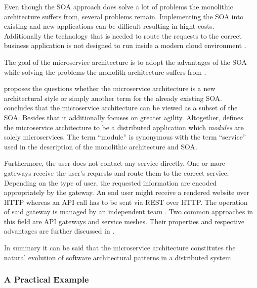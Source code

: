 Even though the \ac{SOA} approach does solve a lot of problems the monolithic
architecture suffers from, several problems remain. Implementing the \ac{SOA}
into existing and new applications can be difficult resulting in hight costs.
Additionally the technology that is needed to route the requests to the correct
business application is not designed to run inside a modern cloud environment
\autocite[p. 584]{VillamizarEvaluatingmonolithicmicroservice2015}.

The goal of the microservice architecture is to adopt the advantages of the
\ac{SOA} while solving the problems the monolith architecture suffers from
\autocite[p. 584]{VillamizarEvaluatingmonolithicmicroservice2015}.

\autocite{VillamizarEvaluatingmonolithicmicroservice2015} proposes the
questions whether the microservice architecture is a new architectural style or
simply another term for the already existing \ac{SOA}.
\autocite{VillamizarEvaluatingmonolithicmicroservice2015} concludes that the
microservice architecture can be viewed as a subset of the \ac{SOA}. Besides
that it additionally focuses on greater agility. Altogether,
\autocite{DragoniMicroservicesyesterdaytoday2016} defines the microservice
architecture to be a distributed application which \textit{modules} are solely
microservices. The term \enquote{module} is synonymous with the term
\enquote{service} used in the description of the monolithic architecture and
\ac{SOA}.

Furthermore, the user does not contact any service directly. One or more
gateways receive the user's requests and route them to the correct service.
Depending on the type of user, the requested information are encoded
appropriately by the gateway. An end user might receive a rendered website over
\ac{HTTP} whereas an \ac{API} call has to be sent via \ac{REST} over \ac{HTTP}.
The operation of said gateway is managed by an independent team \autocite[p.
585]{VillamizarEvaluatingmonolithicmicroservice2015}. Two common approaches in
this field are \ac{API} gateways and service meshes. Their properties and
respective advantages are further discussed in
\autocite{HariharaSubramanianHandsRESTfulAPI2019}.

In summary it can be said that the microservice architecture constitutes the
natural evolution of software architectural patterns in a distributed system.

\subsubsection{A Practical Example}%
\label{ssub:A_Practical_Example}


